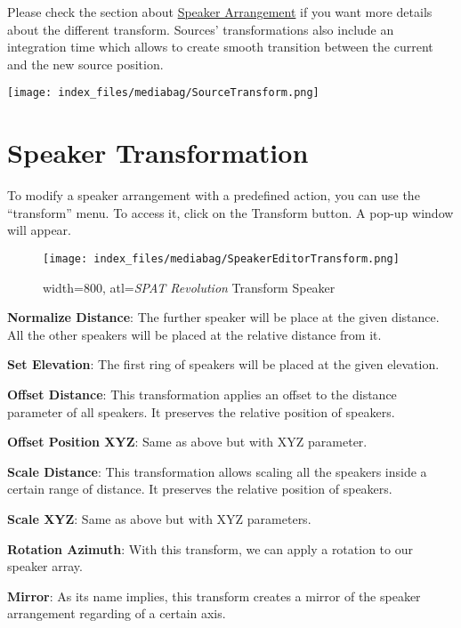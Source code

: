 \documentclass[
  letterpaper,
  DIV=11,
  numbers=noendperiod]{scrreport}
\begin{document}
Please check the section about
\href{Spatialisation_Technology_Speaker_Arrangement.md}{Speaker
Arrangement} if you want more details about the different transform.
Sources' transformations also include an integration time which allows
to create smooth transition between the current and the new source
position.

\texttt{[image: index\_files/mediabag/SourceTransform.png]}

\hypertarget{speaker-transformation}{%
\section{Speaker Transformation}\label{speaker-transformation}}

To modify a speaker arrangement with a predefined action, you can use
the ``transform'' menu. To access it, click on the Transform button. A
pop-up window will appear.

\begin{figure}

{\centering \texttt{[image: index\_files/mediabag/SpeakerEditorTransform.png]}

}

\caption{width=800, atl=\emph{SPAT Revolution} Transform Speaker}

\end{figure}

\textbf{Normalize Distance}: The further speaker will be place at the
given distance. All the other speakers will be placed at the relative
distance from it.

\textbf{Set Elevation}: The first ring of speakers will be placed at the
given elevation.

\textbf{Offset Distance}: This transformation applies an offset to the
distance parameter of all speakers. It preserves the relative position
of speakers.

\textbf{Offset Position XYZ}: Same as above but with XYZ parameter.

\textbf{Scale Distance}: This transformation allows scaling all the
speakers inside a certain range of distance. It preserves the relative
position of speakers.

\textbf{Scale XYZ}: Same as above but with XYZ parameters.

\textbf{Rotation Azimuth}: With this transform, we can apply a rotation
to our speaker array.

\textbf{Mirror}: As its name implies, this transform creates a mirror of
the speaker arrangement regarding of a certain axis.
\end{document}
